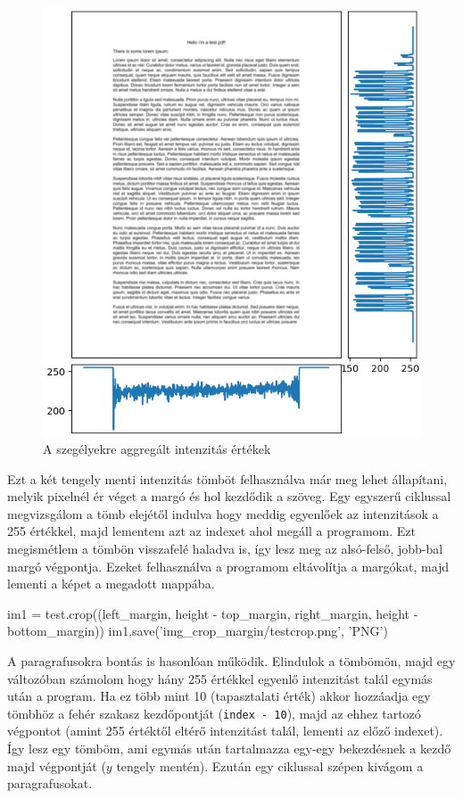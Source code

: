 \begin{figure}[h]
\centering
\includegraphics[scale=1]{images/mf_2.png}
\caption{A szegélyekre aggregált intenzitás értékek}
\label{fig:mf_2}
\end{figure}

Ezt a két tengely menti intenzitás tömböt felhasználva már meg lehet állapítani, melyik pixelnél ér véget a margó és hol kezdődik a szöveg. Egy egyszerű ciklussal megvizsgálom a tömb elejétől indulva hogy meddig egyenlőek az intenzitások a 255 értékkel, majd lementem azt az indexet ahol megáll a programom. Ezt megismétlem a tömbön visszafelé haladva is, így lesz meg az alsó-felső, jobb-bal margó végpontja. Ezeket felhasználva a programom eltávolítja a margókat, majd lementi a képet a megadott mappába.

\begin{python}
im1 = test.crop((left_margin,
                 height - top_margin,
                 right_margin,
                 height - bottom_margin))
im1.save('img_crop_margin/testcrop.png', 'PNG')
\end{python}

A paragrafusokra bontás is hasonlóan működik. Elindulok a tömbömön, majd egy változóban számolom hogy hány 255 értékkel egyenlő intenzitást talál egymás után a program. Ha ez több mint 10 (tapasztalati érték) akkor hozzáadja egy tömbhöz a fehér szakasz kezdőpontját (\texttt{index - 10}), majd az ehhez tartozó végpontot (amint 255 értéktől eltérő intenzitást talál, lementi az előző indexet). Így lesz egy tömböm, ami egymás után tartalmazza egy-egy bekezdésnek a kezdő majd végpontját ($y$ tengely mentén). Ezután egy ciklussal szépen kivágom a paragrafusokat.
